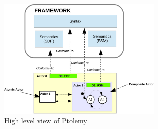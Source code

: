 \begin{figure}[ht!]
	\begin{center}
		\includegraphics[width=0.7\textwidth]{background/figs/ptolemyfig}
		\caption{High level view of Ptolemy~\cite{giraultbib}}
		\label{fig:ptolemyfig}
	\end{center}
\end{figure}

